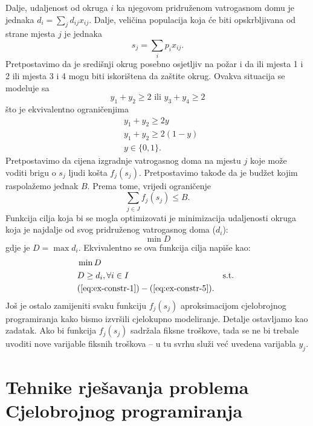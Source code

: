\documentclass[a4paper, utf8, 11pt, colorlinks]{article}
\begin{document}
Dalje, udaljenost od okruga $i$ ka njegovom pridruženom vatrogasnom domu je jednaka $d_i = \sum_{j} d_{ij}x_{ij} $. Dalje, veličina populacija koja će biti opskrbljivana od strane mjesta $j$ je jednaka 
\begin{equation}\label{eq:ex-constr-3}
    s_j = \sum_{i} p_i x_{ij}. 
\end{equation}
Pretpostavimo da je središnji okrug posebno osjetljiv na požar i da ili mjesta 1 i 2 ili mjesta 3 i 4 mogu biti iskorištena da zaštite okrug. Ovakva situacija se modeluje sa
\begin{equation*} 
    y_1 + y_2 \geq 2 \mbox{ ili } y_3 + y_4 \geq 2
\end{equation*}
što je ekvivalentno ograničenjima 
\begin{align}
    &y_1 + y_2 \geq 2 y \nonumber \\
    &y_1 + y_2 \geq 2 (1-y) \nonumber \\
    & y \in \{0, 1 \}.\label{eq:ex-constr-4}
\end{align}
Pretpostavimo da cijena izgradnje vatrogasnog doma na mjestu $j$ koje može voditi brigu o $s_j$ ljudi košta $f_j(s_j)$. Pretpostavimo takođe da je budžet kojim raspolažemo jednak $B$. Prema tome, vrijedi ograničenje
\begin{equation}\label{eq:ex-constr-5}
     \sum_{j \in J} f_j(s_j) \leq B.
\end{equation}
 Funkcija cilja koja bi se mogla optimizovati je minimizacija udaljenosti 
 okruga koja je najdalje od svog pridruženog vatrogasnog doma ($d_i$):
      $$\min D $$
 gdje je $D= \max d_i$. Ekvivalentno se ova funkcija cilja napiše kao:
 \begin{align*}
      &\min D \\
      & D \geq d_i,  \forall i \in I
      & \mbox{s.t. } \\ &(\ref{eq:ex-constr-1})-(\ref{eq:ex-constr-5}).
 \end{align*}
 Još je ostalo zamijeniti svaku funkciju $f_j (s_j)$ aproksimacijom cjelobrojnog programiranja kako bismo izvršili cjelokupno modeliranje. Detalje ostavljamo kao zadatak. Ako bi funkcija $f_j (s_j)$ sadržala fiksne troškove, tada se ne bi trebale uvoditi nove varijable fiksnih troškova -- u tu svrhu služi već uvedena varijabla $y_j$. 
 
 \newpage 
 \section{Tehnike rješavanja problema Cjelobrojnog programiranja}
 
\end{document}

